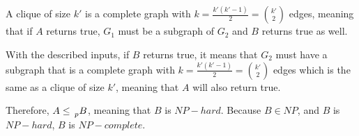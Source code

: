 A clique of size $k'$ is a complete graph with $k=\frac{k\prime(k\prime-1)}{2}=\binom{k\prime}{2}$ edges, meaning that if $A$ returns true, $G_1$  must be a subgraph of $G_2$ and $B$ returns true as well. 

With the described inputs, if $B$ returns true, it means that $G_2$ must have a subgraph that is a complete graph with $k=\frac{k\prime(k\prime-1)}{2}=\binom{k\prime}{2}$ edges which is the same as a clique of size $k'$, meaning that $A$ will also return true.

Therefore, $A \leq{} \prescript{}{p}{B} $, meaning that $B$ is $NP-hard$. Because $B \in NP$, and $B$ is $NP-hard$, $B$ is $NP-complete$.

